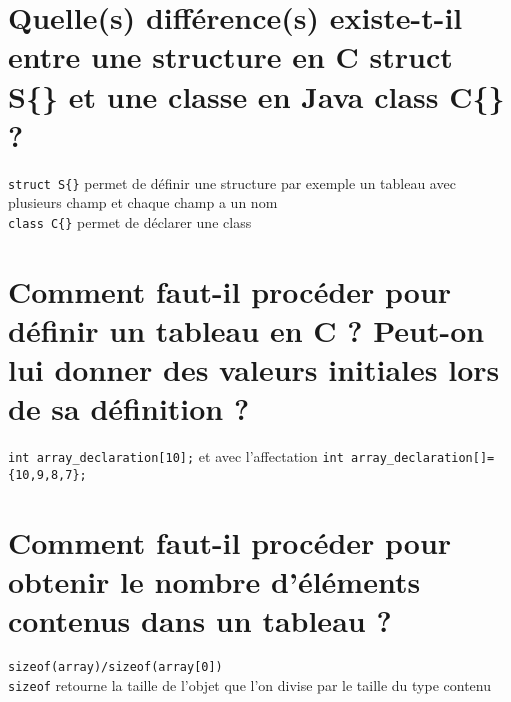 \section{Quelle(s) différence(s) existe-t-il entre une structure en C struct S\{\} et une classe en Java class C\{\} ?}
\texttt{struct S\{\}} permet de définir une structure par exemple un tableau avec plusieurs champ et chaque champ a un nom\\
\texttt{class C\{\}} permet de déclarer une class

\section{Comment faut-il procéder pour définir un tableau en C ? Peut-on lui donner des valeurs initiales lors de sa définition ?}
\texttt{int array\_declaration[10];} et avec l'affectation \texttt{int array\_declaration[]=\{10,9,8,7\};}

\section{Comment faut-il procéder pour obtenir le nombre d'éléments contenus dans un tableau ?}
\texttt{sizeof(array)/sizeof(array[0])}\\ \texttt{sizeof} retourne la taille de l'objet que l'on divise par le taille du type contenu

